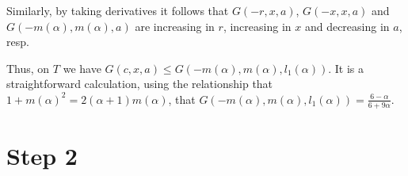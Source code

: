 \documentclass[12pt]{article}
\newcommand{\ds}{\displaystyle}
\begin{document}
\vspace{0.2in}


Similarly, by taking derivatives it follows that ${ G}(-r,x,a)$, ${ G}(-x,x,a)$ and ${ G}(-m(\alpha),m(\alpha),a)$ are increasing in $r$, increasing in $x$ and decreasing in $a$, resp.






\vspace{0.2in}

Thus, on $T$ we have ${ G}(c,x,a) \le { G}(-m(\alpha),m(\alpha),l_1(\alpha))$.  It is a straightforward calculation, using the relationship that $1 + m(\alpha)^2 = 2(\alpha+1)m(\alpha)$, that 
${\ds {G}(-m(\alpha),m(\alpha),l_1(\alpha))= \frac{6-\alpha}{6+9\alpha}}$.  


\section{Step 2}
\end{document}
